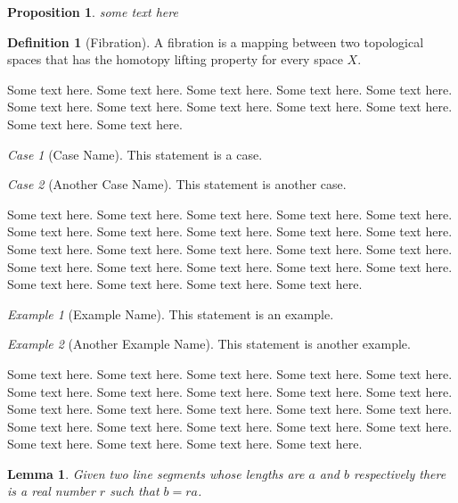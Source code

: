 \documentclass[11pt,twoside]{article}
\theoremstyle{plain}
\newtheorem{proposition}{Proposition}[section]
\newtheorem{lemma}{Lemma}[section]
\theoremstyle{definition}
\newtheorem{definition}{Definition}[section]
\theoremstyle{remark}
\newtheorem{case}{Case}
\newtheorem{example}{Example}
\begin{document}
\begin{proposition}
  some text here
\end{proposition}

\begin{definition}[Fibration]
A fibration is a mapping between two topological spaces that has the homotopy lifting property for every space $X$.
\end{definition}

Some text here. Some text here. Some text here. Some text here.
Some text here. Some text here. Some text here. Some text here.
Some text here. Some text here. Some text here. Some text here.

\setcounter{case}{0}
\begin{case}[Case Name]
This statement is a case.
\end{case}

\begin{case}[Another Case Name]
This statement is another case.
\end{case}

Some text here. Some text here. Some text here. Some text here.
Some text here. Some text here. Some text here. Some text here.
Some text here. Some text here. Some text here. Some text here.
Some text here. Some text here. Some text here. Some text here.
Some text here. Some text here. Some text here. Some text here.
Some text here. Some text here. Some text here. Some text here.




\setcounter{example}{0}
\begin{example}[Example Name]
This statement is an example.
\end{example}

\begin{example}[Another Example Name]
This statement is another example.
\end{example}


Some text here. Some text here. Some text here. Some text here.
Some text here. Some text here. Some text here. Some text here.
Some text here. Some text here. Some text here. Some text here.
Some text here. Some text here. Some text here. Some text here.
Some text here. Some text here. Some text here. Some text here.
Some text here. Some text here. Some text here. Some text here.


\begin{lemma}\label{lem:some_lemma_label}
Given two line segments whose lengths are $a$ and $b$ respectively there
is a real number $r$ such that $b=ra$.
\end{lemma}
\end{document}
